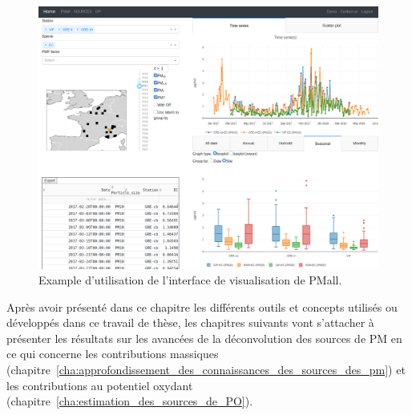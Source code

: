 \begin{figure}[ht]
    \centering
    \includegraphics[width=1.0\linewidth]{figures/chapter02/pmall_example.png}
    \caption{Example d'utilisation de l'interface de visualisation de PMall.}%
    \label{fig:figures/chapter02/pmall_example}
\end{figure}


Après avoir présenté dans ce chapitre les différents outils et concepts utilisés ou
développés dans ce travail de thèse, les chapitres suivants vont s'attacher à présenter
les résultats sur les avancées de la déconvolution des sources de PM en ce qui concerne
les contributions massiques
(chapitre~\ref{cha:approfondissement_des_connaissances_des_sources_des_pm}) et les
contributions au potentiel oxydant (chapitre~\ref{cha:estimation_des_sources_de_PO}).




